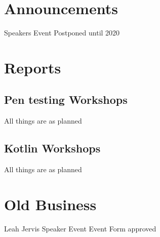 \documentclass[11pt,hacksoc]{meetingmins}
\begin{document}
\maketitle

\section{Announcements}
\begin{items}
	\item
	Speakers Event Postponed until 2020

\end{items}

\section{Reports}

\subsection{Pen testing Workshops}
\begin{hiddensubitems}
	\item
	
	\item
	All things are as planned
\end{hiddensubitems}

\subsection{Kotlin Workshops}
\begin{hiddensubitems}	
	\item
	All things are as planned
\end{hiddensubitems}

\section{Old Business}
\begin{items}
	\item
	Leah Jervis Speaker Event
		\subitem
		Event Form approved
		
		\subitem
		
		\subitem
		
	\item
\end{items}
\end{document}
